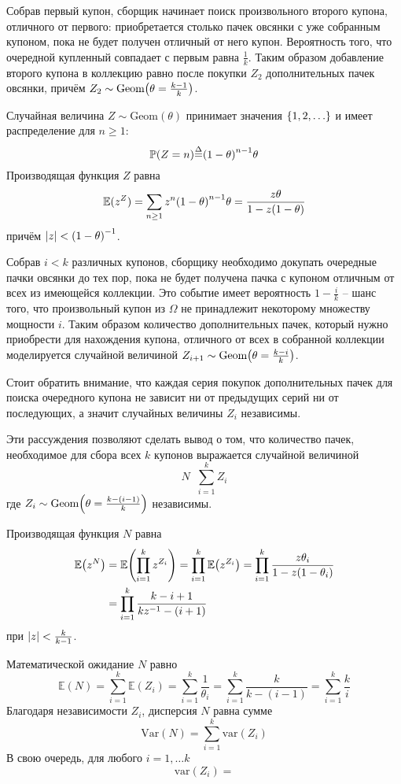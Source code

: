 \documentclass[a4paper]{article}
\let\originalleft\left
\let\originalright\right
\renewcommand{\left}{\mathopen{}\mathclose\bgroup\originalleft}
\renewcommand{\right}{\aftergroup\egroup\originalright}
\newcommand{\obj}[1]{{\left\{ #1 \right \}}}
\newcommand{\brac}[1]{{\left ( #1 \right )}}
\newcommand{\abs}[1]{{\left | #1 \right |}}
\newcommand{\Ex}[0]{{\mathbb{E}}}
\newcommand{\pr}[0]{{\mathbb{P}}}
\newcommand{\defn}{{\mathop{\overset{\Delta}{=}}\nolimits}}
\begin{document}
Собрав первый купон, сборщик начинает поиск произвольного второго
купона, отличного от первого: приобретается столько пачек овсянки с
уже собранным купоном, пока не будет получен отличный от него купон.
Вероятность того, что очередной купленный совпадает с первым равна
$\frac{1}{k}$. Таким образом добавление второго купона в коллекцию
равно после покупки $Z_2$ дополнительных пачек овсянки, причём
$Z_2\sim \text{Geom}\brac{\theta=\frac{k-1}{k}}$.

Случайная величина $Z\sim\text{Geom}(\theta)$ принимает значения
$\obj{1,2,\ldots}$ и имеет распределение для $n\geq 1$:
\[\pr(Z=n) \defn \brac{1-\theta}^{n-1} \theta\]
Производящая функция $Z$ равна
\[\Ex(z^Z) = \sum_{n\geq1} z^n \brac{1-\theta}^{n-1} \theta
= \frac{z\theta}{1-z(1-\theta)} \]
причём $\abs{z}<\brac{1-\theta}^{-1}$.

Собрав $i<k$ различных купонов, сборщику необходимо докупать
очередные пачки овсянки до тех пор, пока не будет получена пачка с
купоном отличным от всех из имеющейся коллекции.
Это событие имеет вероятность $1-\frac{i}{k}$ -- шанс того, что
произвольный купон из $\Omega$ не принадлежит некоторому множеству
мощности $i$.
Таким образом количество дополнительных пачек, который нужно
приобрести для нахождения купона, отличного от всех в собранной
коллекции моделируется случайной величиной
$Z_{i+1}\sim \text{Geom}\brac{\theta=\frac{k-i}{k}}$.

Стоит обратить внимание, что каждая серия покупок дополнительных
пачек для поиска очередного купона не зависит ни от предыдущих серий
ни от последующих, а значит случайных величины $Z_i$ независимы.

Эти рассуждения позволяют сделать вывод о том, что количество пачек,
необходимое для сбора всех $k$ купонов выражается случайной величиной
\[N\defn \sum_{i=1}^k Z_i\]
где $Z_i\sim \text{Geom}\brac{\theta=\frac{k-(i-1)}{k}}$ независимы.

Производящая функция $N$ равна
\begin{align*}
	\Ex\brac{z^N} &= \Ex\brac{\prod_{i=1}^k z^{Z_i}}
		= \prod_{i=1}^k \Ex\brac{z^{Z_i}}
		= \prod_{i=1}^k \frac{z\theta_i}{1-z(1-\theta_i)} \\
		& = \prod_{i=1}^k \frac{k-i+1}{k z^{-1}-(i+1)}
\end{align*}
при $\abs{z}<\frac{k}{k-1}$.

Математической ожидание $N$ равно
\[\Ex(N) = \sum_{i=1}^k \Ex(Z_i) = \sum_{i=1}^k \frac{1}{\theta_i}
= \sum_{i=1}^k \frac{k}{k-(i-1)} = \sum_{i=1}^k \frac{k}{i} \]
Благодаря независимости $Z_i$, дисперсия $N$ равна сумме
\[\text{Var}(N) = \sum_{i=1}^k \text{var}(Z_i)\]
В свою очередь, для любого $i=1,\ldots k$
\[\text{var}(Z_i) = \]
\end{document}
